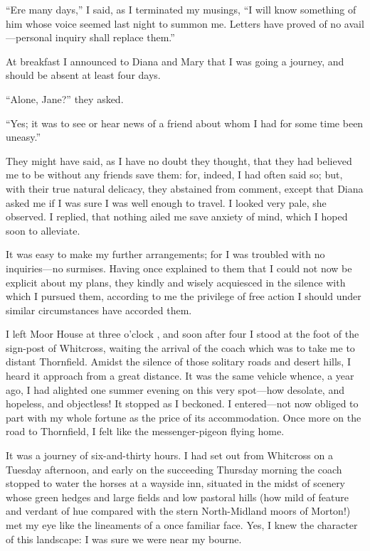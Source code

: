 \enquote{Ere many days,} I said, as I terminated my musings, \enquote{I
	will know something of him whose voice seemed last night to summon me.
	Letters have proved of no avail---personal inquiry shall replace them.}

At breakfast I announced to Diana and Mary that I was going a journey,
and should be absent at least four days.

\enquote{Alone, Jane?} they asked.

\enquote{Yes; it was to see or hear news of a friend about whom I had
	for some time been uneasy.}

They might have said, as I have no doubt they thought, that they had
believed me to be without any friends save them: for, indeed, I had
often said so; but, with their true natural delicacy, they abstained
from comment, except that Diana asked me if I was sure I was well enough
to travel. I looked very pale, she observed. I replied, that nothing
ailed me save anxiety of mind, which I hoped soon to alleviate.

It was easy to make my further arrangements; for I was troubled with no
inquiries---no surmises. Having once explained to them that I could not
now be explicit about my plans, they kindly and wisely acquiesced in the
silence with which I pursued them, according to me the privilege of free
action I should under similar circumstances have accorded them.

I left Moor House at three o'clock \PM, and soon after four I stood at
the foot of the sign-post of Whitcross, waiting the arrival of the coach
which was to take me to distant Thornfield. Amidst the silence of those
solitary roads and desert hills, I heard it approach from a great
distance. It was the same vehicle whence, a year ago, I had alighted
one summer evening on this very spot---how desolate, and hopeless, and
objectless! It stopped as I beckoned. I entered---not now obliged to
part with my whole fortune as the price of its accommodation. Once more
on the road to Thornfield, I felt like the messenger-pigeon flying home.

It was a journey of six-and-thirty hours. I had set out from Whitcross
on a Tuesday afternoon, and early on the succeeding Thursday morning the
coach stopped to water the horses at a wayside inn, situated in the
midst of scenery whose green hedges and large fields and low pastoral
hills (how mild of feature and verdant of hue compared with the stern
North-Midland moors of Morton!) met my eye like the lineaments of a once
familiar face. Yes, I knew the character of this landscape: I was sure
we were near my bourne.

